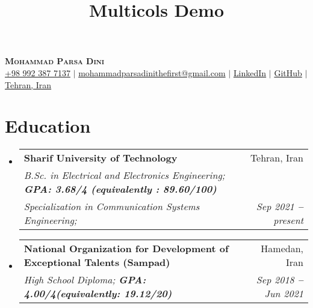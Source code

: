 \documentclass[letterpaper,11pt]{article}
\title{Multicols Demo}
\makeatletter
\newcommand{\resumeSubheading}[4]{
	\vspace{-2pt}\item
	\begin{tabular*}{0.97\textwidth}[t]{l@{\extracolsep{\fill}}r}
		\textbf{#1} & #2 \\
		\textit{\small#3} & \textit{\small #4} \\
	\end{tabular*}\vspace{-7pt}
}
\newcommand{\resumeEducationHeading}[6]{
	\vspace{-2pt}\item
	\begin{tabular*}{0.97\textwidth}[t]{l@{\extracolsep{\fill}}r}
		\textbf{#1} & #2 \\
		\textit{\small#3} & \textit{\small #4} \\
		\textit{\small#5} & \textit{\small #6} \\
	\end{tabular*}\vspace{-5pt}
}
\newcommand{\resumeSubHeadingListStart}{\begin{itemize}[leftmargin=0.15in, label={}]}
\newcommand{\resumeSubHeadingListEnd}{\end{itemize}}
\makeatother
\begin{document}
	\begin{center}
		\textbf{\Huge \scshape Mohammad Parsa Dini} \\ \vspace{3pt}
		\small
		\faMobile \hspace{.5pt} \href{tel:989175955982}{+98 992 387 7137}
		$|$
		\faAt \hspace{.5pt} \href{mailto:alireza.agm@gmail.com}{mohammadparsadinithefirst@gmail.com}
		$|$
		\faLinkedinSquare \hspace{.5pt} \href{https://www.linkedin.com/in/mohammad-parsa-dini}{LinkedIn}
		$|$
		\faGithub \hspace{.5pt} \href{https://github.com/MohammadParsaTheFirst}{GitHub}
		$|$
		\faMapMarker \hspace{.5pt} \href{https://www.google.com/maps/place/Sharif+University+of+Technology/@35.7036491,51.3495146,17z/data=!3m1!4b1!4m5!3m4!1s0x3f8e00a8bc1a7e63:0x61a5a909b878501!8m2!3d35.7036491!4d51.3517033}{Tehran, Iran}
	\end{center}
	\section{Education}
	\vspace{3pt}
	\resumeSubHeadingListStart
	
	\resumeEducationHeading
	{Sharif University of Technology
	}{Tehran, Iran}
	{B.Sc. in Electrical and Electronics Engineering;   \textbf{GPA: 3.68/4 (equivalently : 
        89.60/100)}}{}
	{Specialization in Communication Systems Engineering;}{Sep 2021 \textbf{--} present}
	  
	\resumeSubheading
	{National Organization for Development of Exceptional Talents (Sampad)
	}{Hamedan, Iran}
	{High School Diploma;   \textbf{GPA: 4.00/4(equivalently: 19.12/20) }}{Sep 2018 \textbf{--} Jun 2021}
	
	\resumeSubHeadingListEnd
\end{document}
